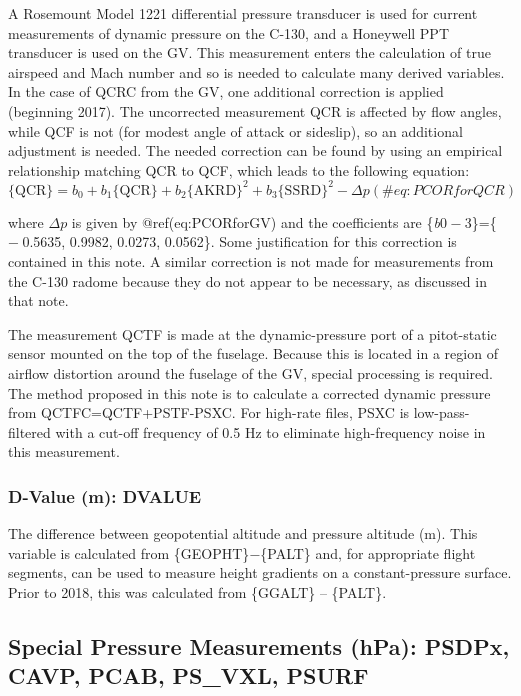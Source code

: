 \documentclass[
  english,
]{book}
\begin{document}
A Rosemount Model 1221 differential pressure transducer is used for
current measurements of dynamic pressure on the C-130, and a Honeywell
PPT transducer is used on the GV. This measurement enters the
calculation of true airspeed and Mach number and so is needed to
calculate many derived variables. In the case of QCRC from the GV, one
additional correction is applied (beginning 2017). The uncorrected
measurement QCR is affected by flow angles, while QCF is not (for modest
angle of attack or sideslip), so an additional adjustment is needed. The
needed correction can be found by using an empirical relationship
matching QCR to QCF, which leads to the following equation:\\
\begin{equation}
\mathrm{\{QCR\}}=b_0+b_1\mathrm{\{QCR\}}+b_2\mathrm{\{AKRD\}}^2+b_3\mathrm{\{SSRD\}}^2-\Delta p
(\#eq:PCORforQCR)
\end{equation}

where \(\Delta p\) is given by @ref(eq:PCORforGV) and the coefficients
are \{{\emph{b}0 − 3}\}=\{{ − 0.5635}, {0.9982}, 0.0273, {0.0562}\}.
Some justification for this correction is contained in this note. A
similar correction is not made for measurements from the C-130 radome
because they do not appear to be necessary, as discussed in that note.

The measurement QCTF is made at the dynamic-pressure port of a
pitot-static sensor mounted on the top of the fuselage. Because this is
located in a region of airflow distortion around the fuselage of the GV,
special processing is required. The method proposed in this note is to
calculate a corrected dynamic pressure from QCTFC=QCTF+PSTF-PSXC. For
high-rate files, PSXC is low-pass-filtered with a cut-off frequency of
0.5 Hz to eliminate high-frequency noise in this measurement.

\hypertarget{dvalue}{%
\subsubsection*{D-Value (m): DVALUE}\label{dvalue}}

The difference between geopotential altitude and pressure altitude (m).
This variable is calculated from \{GEOPHT\}{−}\{PALT\} and, for
appropriate flight segments, can be used to measure height gradients on
a constant-pressure surface. Prior to 2018, this was calculated from
\{GGALT\} -- \{PALT\}.

\hypertarget{p-special}{%
\subsection*{Special Pressure Measurements (hPa): PSDPx, CAVP, PCAB,
PS\_VXL, PSURF}\label{p-special}}
\end{document}

